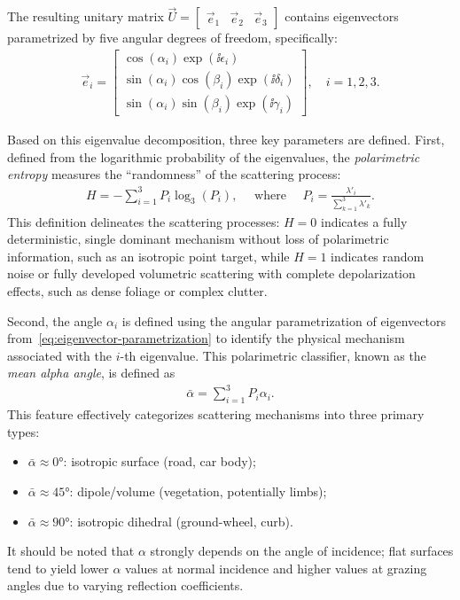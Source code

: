 The resulting unitary matrix $\vec U = \begin{bmatrix} \vec e_1 & \vec e_2 & \vec e_3 \end{bmatrix}$ contains eigenvectors parametrized by five angular degrees of freedom, specifically:
\begin{align}
    \label{eq:eigenvector-parametrization}
    \vec e_i = \begin{bmatrix}
        \cos(\alpha_i)\exp(\ii\epsilon_i) \\
        \sin(\alpha_i) \cos(\beta_i) \exp(\ii \delta_i) \\
        \sin(\alpha_i) \sin(\beta_i) \exp(\ii \gamma_i)
    \end{bmatrix}, \quad i=1,2,3.
\end{align}

Based on this eigenvalue decomposition, three key parameters are defined.
First, defined from the logarithmic probability of the eigenvalues, the \emph{polarimetric entropy} measures the \enquote{randomness} of the scattering process:
\begin{align}
    \label{eq:polarimetric-entropy}
    H = -\sum_{i=1}^3 P_i \log_3(P_i), \quad\text{ where }\quad P_i = \frac{\lambda'_i}{\sum_{k=1}^3 \lambda'_k}.
\end{align}
This definition delineates the scattering processes: $H=0$ indicates a fully deterministic, single dominant mechanism without loss of polarimetric information, such as an isotropic point target, while $H=1$ indicates random noise or fully developed volumetric scattering with complete depolarization effects, such as dense foliage or complex clutter.

Second, the angle $\alpha_i$ is defined using the angular parametrization of eigenvectors from~\cref{eq:eigenvector-parametrization} to identify the physical mechanism associated with the $i$-th eigenvalue.
This polarimetric classifier, known as the \emph{mean alpha angle}, is defined as
\begin{align}
    \label{eq:mean-alpha-angle}
    \bar{\alpha} = \sum_{i=1}^3 P_i \alpha_i.
\end{align}
This feature effectively categorizes scattering mechanisms into three primary types:
\begin{itemize}
    \item $\bar{\alpha} \approx \ang{0}$: isotropic surface (road, car body);
    \item $\bar{\alpha} \approx \ang{45}$: dipole/volume (vegetation, potentially limbs);
    \item $\bar{\alpha} \approx \ang{90}$: isotropic dihedral (ground-wheel, curb).
\end{itemize}
It should be noted that $\alpha$ strongly depends on the angle of incidence; flat surfaces tend to yield lower $\alpha$ values at normal incidence and higher values at grazing angles due to varying reflection coefficients.

